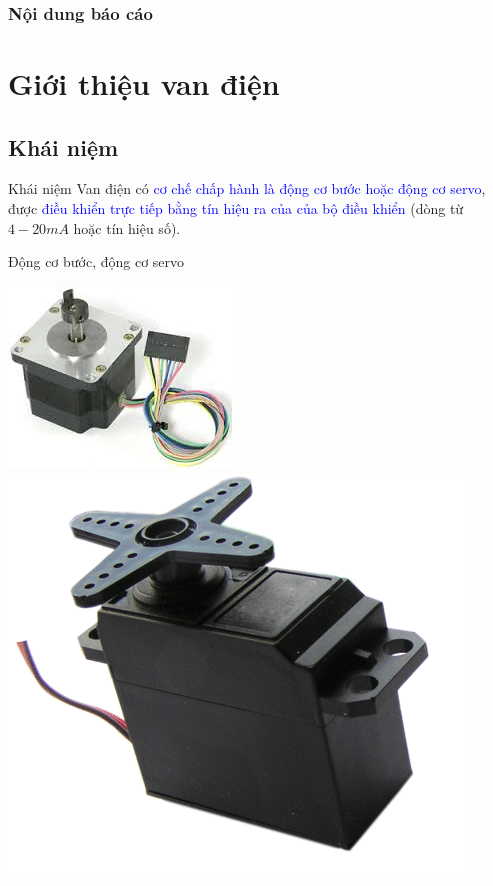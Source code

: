 \documentclass[20pt]{beamer}
\begin{document}
\begin{frame}	%
	\frametitle{Nội dung báo cáo}
	\tableofcontents
\end{frame}

\section{Giới thiệu van điện}
\subsection*{Khái niệm}
\begin{frame}{Khái niệm}
\justifying
\alert{Van điện} có \textcolor{blue}{cơ chế chấp hành là động cơ bước hoặc động cơ servo}, được \textcolor{blue}{điều khiển trực tiếp bằng tín hiệu ra của của bộ điều khiển} (dòng từ $4-20mA$ hoặc tín hiệu số).
\end{frame}

\begin{frame}{Động cơ bước, động cơ servo}
\vspace{-.5cm}
\begin{center}
\includegraphics[scale=.8]{images/dong-co-buoc.jpg} 
\includegraphics[scale=.35]{images/servo-motor.png} 
\end{center}
\end{frame}
\end{document}
